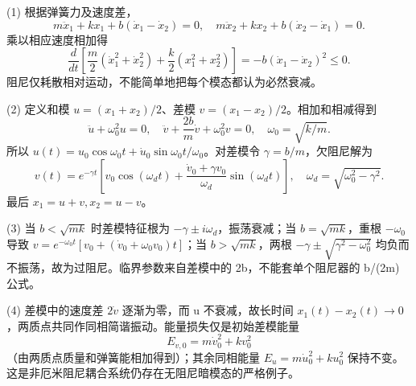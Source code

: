 (1) 根据弹簧力及速度差，
\[
m\ddot x_1+kx_1+b(\dot x_1-\dot x_2)=0,\quad
m\ddot x_2+kx_2+b(\dot x_2-\dot x_1)=0.
\]
乘以相应速度相加得
\[
\frac{d}{dt}\left[\frac m2(\dot x_1^2+\dot x_2^2)+\frac k2(x_1^2+x_2^2)\right]
=-b(\dot x_1-\dot x_2)^2\le0.
\]
阻尼仅耗散相对运动，不能简单地把每个模态都认为必然衰减。

(2) 定义和模 \(u=(x_1+x_2)/2\)、差模 \(v=(x_1-x_2)/2\)。相加和相减得到
\[
\ddot u+\omega_0^2u=0,\quad
\ddot v+\frac{2b}{m}\dot v+\omega_0^2v=0,\quad
\omega_0=\sqrt{k/m}.
\]
所以 \(u(t)=u_0\cos\omega_0t+\dot u_0\sin\omega_0t/\omega_0\)。对差模令 \(\gamma=b/m\)，欠阻尼解为
\[
v(t)=e^{-\gamma t}\left[v_0\cos(\omega_dt)+\frac{\dot v_0+\gamma v_0}{\omega_d}\sin(\omega_dt)\right],
\quad\omega_d=\sqrt{\omega_0^2-\gamma^2}.
\]
最后 \(x_1=u+v,x_2=u-v\)。

(3) 当 \(b<\sqrt{mk}\) 时差模特征根为 \(-\gamma\pm i\omega_d\)，振荡衰减；当 \(b=\sqrt{mk}\)，重根 \(-\omega_0\) 导致
\(v=e^{-\omega_0t}[v_0+(\dot v_0+\omega_0v_0)t]\)；当 \(b>\sqrt{mk}\)，两根 \(-\gamma\pm\sqrt{\gamma^2-\omega_0^2}\) 均负而不振荡，故为过阻尼。临界参数来自差模中的 2b，不能套单个阻尼器的 b/(2m) 公式。

(4) 差模中的速度差 \(2\dot v\) 逐渐为零，而 u 不衰减，故长时间 \(x_1(t)-x_2(t)\to0\)，两质点共同作同相简谐振动。能量损失仅是初始差模能量
\[
E_{v,0}=m\dot v_0^2+kv_0^2
\]
（由两质点质量和弹簧能相加得到）；其余同相能量 \(E_u=m\dot u_0^2+ku_0^2\) 保持不变。这是非厄米阻尼耦合系统仍存在无阻尼暗模态的严格例子。

